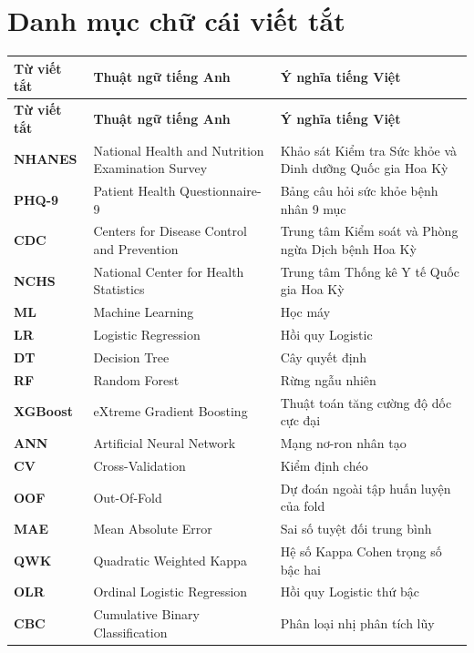 \chapter*{Danh mục chữ cái viết tắt}

\begin{longtable}{p{2.5cm} p{6.5cm} p{6.0cm}}
\toprule
\textbf{Từ viết tắt} & \textbf{Thuật ngữ tiếng Anh} & \textbf{Ý nghĩa tiếng Việt} \\
\midrule
\endfirsthead
\toprule
\textbf{Từ viết tắt} & \textbf{Thuật ngữ tiếng Anh} & \textbf{Ý nghĩa tiếng Việt} \\
\midrule
\endhead
\bottomrule
\endfoot

\textbf{NHANES} & National Health and Nutrition Examination Survey & Khảo sát Kiểm tra Sức khỏe và Dinh dưỡng Quốc gia Hoa Kỳ \\
\textbf{PHQ-9}  & Patient Health Questionnaire-9 & Bảng câu hỏi sức khỏe bệnh nhân 9 mục \\
\textbf{CDC}    & Centers for Disease Control and Prevention & Trung tâm Kiểm soát và Phòng ngừa Dịch bệnh Hoa Kỳ \\
\textbf{NCHS}   & National Center for Health Statistics & Trung tâm Thống kê Y tế Quốc gia Hoa Kỳ \\
\textbf{ML}     & Machine Learning & Học máy \\
\textbf{LR}     & Logistic Regression & Hồi quy Logistic \\
\textbf{DT}     & Decision Tree & Cây quyết định \\
\textbf{RF}     & Random Forest & Rừng ngẫu nhiên \\
\textbf{XGBoost}& eXtreme Gradient Boosting & Thuật toán tăng cường độ dốc cực đại \\
\textbf{ANN}    & Artificial Neural Network & Mạng nơ-ron nhân tạo \\
\textbf{CV}     & Cross-Validation & Kiểm định chéo \\
\textbf{OOF}    & Out-Of-Fold & Dự đoán ngoài tập huấn luyện của fold \\
\textbf{MAE}    & Mean Absolute Error & Sai số tuyệt đối trung bình \\
\textbf{QWK}    & Quadratic Weighted Kappa & Hệ số Kappa Cohen trọng số bậc hai \\
\textbf{OLR}    & Ordinal Logistic Regression & Hồi quy Logistic thứ bậc \\
\textbf{CBC}    & Cumulative Binary Classification & Phân loại nhị phân tích lũy \\

\end{longtable}
